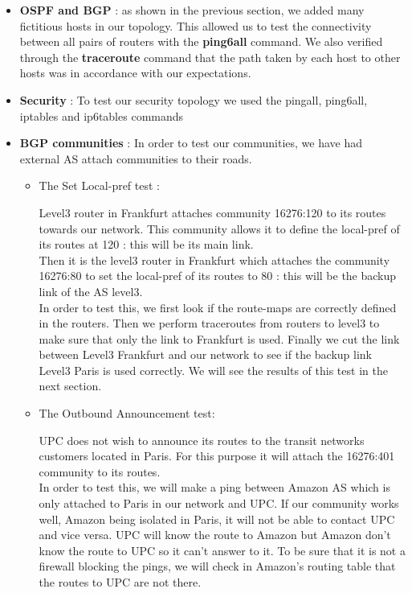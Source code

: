 \documentclass[letter, 9pt, conference]{ieeeconf}
\begin{document}
\begin{itemize}
    \item \textbf{OSPF and BGP} : as shown in the previous section, we added many fictitious hosts in our topology. This allowed us to test the connectivity between all pairs of routers with the \textbf{ping6all} command. We also verified through the \textbf{traceroute} command that the path taken by each host to other hosts was in accordance with our expectations.
    \item \textbf{Security} : To test our security topology we used the pingall, ping6all, iptables and ip6tables commands
    
    \item \textbf{BGP communities} : In order to test our communities, we have had external AS attach communities to their roads.\\
    
    \begin{itemize}
        \item The Set Local-pref test : 
        
        Level3 router in Frankfurt attaches community 16276:120 to its routes towards our network. This community allows it to define the local-pref of its routes at 120 : this will be its main link.\\
        Then it is the level3 router in Frankfurt which attaches the community 16276:80 to set the local-pref of its routes to 80 : this will be the backup link of the AS level3.\\
        
        In order to test this, we first look if the route-maps are correctly defined in the routers. Then we perform traceroutes from routers to level3 to make sure that only the link to Frankfurt is used. Finally we cut the link between Level3 Frankfurt and our network to see if the backup link Level3 Paris is used correctly. We will see the results of this test in the next section.\\
        
        \item The Outbound Announcement test:
        
        UPC does not wish to announce its routes to the transit networks customers located in Paris. For this purpose it will attach the 16276:401 community to its routes.\\

        In order to test this, we will make a ping between Amazon AS which is only attached to Paris in our network and UPC. If our community works well, Amazon being isolated in Paris, it will not be able to contact UPC and vice versa. UPC will know the route to Amazon but Amazon don't know the route to UPC so it can't answer to it.
        To be sure that it is not a firewall blocking the pings, we will check in Amazon's routing table that the routes to UPC are not there.
        

\end{itemize}
\end{itemize}
\end{document}
